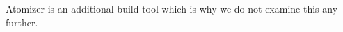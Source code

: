 Atomizer is an additional build tool which is why we do not examine this any further.







% 

% 
